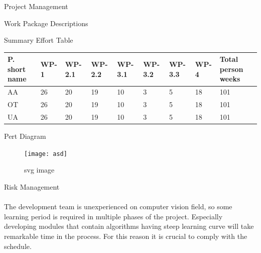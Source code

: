 \documentclass[12pt, a4paper]{article} \pagenumbering{gobble}
\begin{document}
\begin{section}{Project Management}
\begin{subsubsection}{Work Package Descriptions}
\end{subsubsection}
\newpage
\begin{subsubsection}{Summary Effort Table}
  \begin{tabularx}{\textwidth}{|*{9}{Y|}}
   \hline
   \textbf{P. short name} & \textbf{WP-1} & \textbf{WP-2.1} & \textbf{WP-2.2} & \textbf{WP-3.1} & \textbf{WP-3.2} & \textbf{WP-3.3} & \textbf{WP-4} & \textbf{Total person weeks} \\
   \hline
   AA & 26 & 20 & 19 & 10 & 3 & 5 & 18 & 101 \\
   \hline
   OT & 26 & 20 & 19 & 10 & 3 & 5 & 18 & 101 \\
   \hline
   UA & 26 & 20 & 19 & 10 & 3 & 5 & 18 & 101 \\
  \hline
 \end{tabularx}
\end{subsubsection}
\newpage
\begin{landscape}
\begin{subsection}{Pert Diagram}
  \newline
  \vspace{1cm}
  \newline
  \begin{figure}
  \centering
  \texttt{[image: asd]}
  \caption{svg image}
\end{figure}
\end{subsection}
\end{landscape}
\newpage
\begin{subsection}{Risk Management}
  \paragraph{}{%
  The development team is unexperienced on computer vision field, so some learning
  period is required in multiple phases of the project. Especially developing modules that contain algorithms
  having steep learning curve will take remarkable time in the process. For this reason it is crucial to comply with
  the schedule.\\
  }
\end{subsection}
\end{section}
\end{document}
